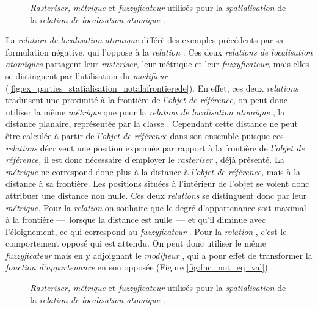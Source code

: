 \begin{figure}
  \centering
  
  \caption{\emph{Rasteriser,} \emph{métrique} et \emph{fuzzyficateur}
    utilisés pour la \emph{spatialisation} de la \emph{relation de
      localisation atomique}
    \protect{}.}
  \label{fig:ex_parties_statialisation_dansplani}
\end{figure}

La \emph{relation de localisation atomique}
 différè des exemples
précédents par sa formulation négative, qui l'oppose à la
\emph{relation} . Ces deux
\emph{relations de localisation atomiques} partagent leur
\emph{rasteriser,} leur métrique et leur \emph{fuzzyficateur,} mais
elles se distinguent par l'utilisation du \emph{modifieur}
(\autoref{fig:ex_parties_statialisation_notalafrontierede}). En effet,
ces deux \emph{relations} traduisent une proximité à la frontière de
\emph{l'objet de référence,} on peut donc utiliser la même
\emph{métrique} que pour la \emph{relation de localisation atomique}
\protect{}, la distance
planaire, représentée par la classe . Cependant
cette distance ne peut être calculée à partir de \emph{l'objet de
  référence} dans son ensemble puisque ces \emph{relations} décrivent
une position exprimée par rapport à la frontière de \emph{l'objet de
  référence,} il est donc nécessaire d'employer le \emph{rasteriser}
, déjà présenté. La \emph{métrique} ne
correspond donc plus à la distance à \emph{l'objet de référence,} mais
à la distance à sa frontière. Les positions situées à l'intérieur de
l'objet se voient donc attribuer une distance non nulle. Ces deux
\emph{relations} se distinguent donc par leur \emph{métrique.} Pour la
\emph{relation}  on souhaite que
le degré d'appartenance soit maximal à la frontière ---~lorsque la
distance est nulle~--- et qu'il diminue avec l'éloignement, ce qui
correspond au \emph{fuzzyficateur} . Pour la
\emph{relation} , c'est le
comportement opposé qui est attendu. On peut donc utiliser le même
\emph{fuzzyficateur} mais en y adjoignant le \emph{modifieur}
, qui a pour effet de transformer la \emph{fonction
  d'appartenance} en son opposée (Figure \ref{fig:fnc_not_eq_val}).

\begin{figure}
  \centering  
  \caption{\emph{Rasteriser,} \emph{métrique} et \emph{fuzzyficateur}
    utilisés pour la \emph{spatialisation} de la \emph{relation de
      localisation atomique}
    \protect{}.}
  \label{fig:ex_parties_statialisation_notalafrontierede}
\end{figure}

